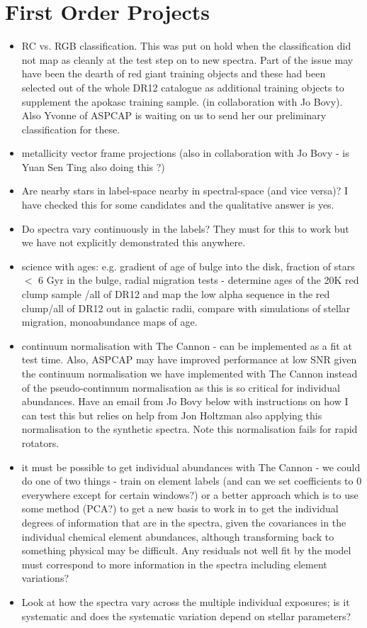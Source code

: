 \documentclass[11pt]{amsart}
\begin{document}
\section{First Order Projects}
\begin{itemize}
\item RC vs. RGB classification.
This was put on hold when the classification did not map as cleanly at the test step on to new spectra. Part of the issue may have been the dearth of red giant training objects and these had been selected out of the whole DR12 catalogue as additional training objects to supplement the apokasc training sample. (in collaboration with Jo Bovy). Also Yvonne of ASPCAP is waiting on us to send her our preliminary classification for these. 
\item metallicity vector frame projections (also in collaboration with Jo Bovy - is Yuan Sen Ting also doing this ?)
\item Are nearby stars in label-space nearby in spectral-space (and vice versa)?
I have checked this for some candidates and the qualitative answer is yes. 
\item Do spectra vary continuously in the labels?
They must for this to work but we have not explicitly demonstrated this anywhere.
\item science with ages: e.g. gradient of age of bulge into the disk, fraction of stars $<$ 6 Gyr in the bulge, radial migration tests - determine ages of the 20K red clump sample /all of DR12 and map the low alpha sequence in the red clump/all of DR12 out in galactic radii, compare with simulations of stellar migration, monoabundance maps of age. 
\item continuum normalisation with The Cannon - can be implemented as a fit at test time. Also, ASPCAP may have improved performance at low SNR given the continuum normalisation we have implemented with The Cannon instead of the pseudo-continnum normalisation as this is so critical for individual abundances. Have an email from Jo Bovy below with instructions on how I can test this but relies on help from Jon Holtzman also applying this normalisation to the synthetic spectra. Note this normalisation fails for rapid rotators. \\
\item it must be possible to get individual abundances with The Cannon - we could do one of two things - train on element labels  (and can we set coefficients  to 0 everywhere except for certain windows?) or a better approach which is to use some method (PCA?) to get a new basis to work in to get the individual degrees of information that are in the spectra, given the covariances in the individual chemical element abundances, although transforming back to something physical may be difficult. Any residuals not well fit by the model must correspond to more information in the spectra including element variations? 
\item Look at how the spectra vary across the multiple individual exposures; is it systematic and does the systematic variation depend on stellar parameters?
\end{itemize} 
\end{document}
